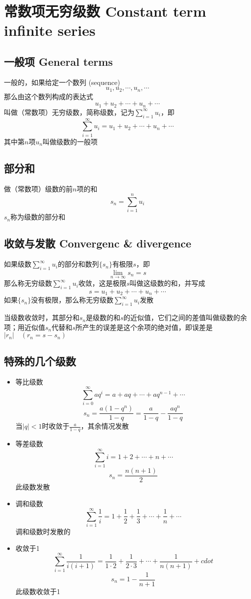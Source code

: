 \documentclass[UTF8]{ctexart}
\newcommand{\abs}[1]{{\left|{#1}\right|}}
\newcommand{\emplin}{\vspace{1em}}
\begin{document}
\section*{常数项无穷级数 Constant term infinite series}
\subsection*{一般项 General terms}
一般的，如果给定一个数列 (sequence)
\[u_1,u_2,\cdots,u_n,\cdots\]
那么由这个数列构成的表达式
\[u_1+u_2+\cdots+u_n+\cdots\]
叫做（常数项）无穷级数，简称级数，记为$\sum_{i=1}^\infty u_i$，即
\[\sum_{i=1}^\infty u_i=u_1+u_2+\cdots+u_n+\cdots\]
其中第$n$项$u_n$叫做级数的一般项

\subsection*{部分和}

做（常数项）级数的前$n$项的和
\[s_n=\sum_{i=1}^n u_i\]
$s_n$称为级数的部分和

\subsection*{收敛与发散 Convergenc \& divergence}
如果级数$\sum_{i=1}^\infty u_i$的部分和数列$\{ s_n\}$有极限$s$，即
\[ \lim_{n\to\infty}s_n=s \]
那么称无穷级数$\sum_{i=1}^\infty u_i$收敛，这是极限$s$叫做这级数的和，并写成
\[ s= u_1+u_2+\cdots+u_n+\cdots\]
如果$\{ s_n\}$没有极限，那么称无穷级数$\sum_{i=1}^\infty u_i$发散

\emplin

当级数收敛时，其部分和$s_n$是级数的和$s$的近似值，它们之间的差值叫做级数的余项；用近似值$s_n$代替和$s$所产生的误差是这个余项的绝对值，即误差是$\abs{r_n}\quad(r_n=s-s_n)$

\subsection*{特殊的几个级数}
\begin{itemize}
  \item 等比级数
  \[ \sum_{i=0}^\infty aq^i=a+aq+\cdots+aq^{n-1}+\cdots\]
  \[s_n=\frac{a(1-q^n)}{1-q}=\frac{a}{1-q}-\frac{aq^n}{1-q} \]
  当$\abs{q}<1$时收敛于$\displaystyle \frac{a}{1-q}$，其余情况发散
  \item 等差级数
  \[ \sum_{i=1}^\infty i=1+2+\cdots+n+\cdots\]
  \[ s_n=\frac{n(n+1)}{2} \]
  此级数发散
  \item 调和级数
  \[ \sum_{i=1}^\infty \frac{1}{i}=1+\frac{1}{2}+\frac{1}{3}+\cdots+\frac{1}{n}+\cdots\]
  调和级数时发散的
  \item 收敛于1
  \[ \sum_{i=1}^\infty \frac{1}{i(i+1)}=\frac{1}{1\cdot2}+\frac{1}{2\cdot3}+\cdots+\frac{1}{n(n+1)}+cdot\]
  \[s_n=1-\frac{1}{n+1}\]
  此级数收敛于1
\end{itemize}
\end{document}

